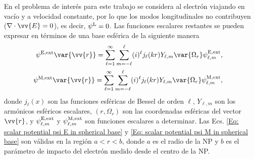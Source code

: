 En el problema de interés para este trabajo se considera al electrón viajando en vacío y a velocidad constante, por lo que los modos longitudinales no contribuyen ($\nabla\cdot\vv{E}=0$), es decir, $\psi^{\rm L} = 0$. Las funciones escalares restantes se pueden expresar en términos de una base esférica de la siguiente manera \cite{de1999relativistic}
\begin{align}
\psi^{\rm E, ext}\var{\vv{r}} = \sum_{\ell=1}^{\infty}\sum_{m=-\ell}^{\ell}(i)^{\ell} j_{\ell}(kr) Y_{\ell, m}\var{\Omega_r}\psi_{\ell,m}^{\rm E, ext},\label{Eq: scalar potential psi E in spherical base}\\
\psi^{\rm M, ext}\var{\vv{r}} = \sum_{\ell=1}^{\infty}\sum_{m=-\ell}^{\ell}(i)^{\ell} j_{\ell}(kr) Y_{\ell, m}\var{\Omega_r}\psi_{\ell,m}^{\rm M, ext}, \label{Eq: scalar potential psi M in spherical base}
\end{align}
donde $j_{\ell}(x)$ son las funciones esféricas de Bessel de orden $\ell$, $Y_{\ell, m}$ son los armónicos esféricos escalares, $(r, \Omega_r)$ son las coordenadas esféricas del vector $\vv{r}$, y $\psi_{\ell,m}^{\rm E, ext}$ y $\psi_{\ell,m}^{\rm M, ext}$ son funciones escalares a determinar. Las Ecs. \eqref{Eq: scalar potential psi E in spherical base} y \eqref{Eq: scalar potential psi M in spherical base} son válidas en la región $a < r < b$, donde $a$ es el radio de la NP y $b$ es el parámetro de impacto del electrón medido desde el centro de la NP.  


